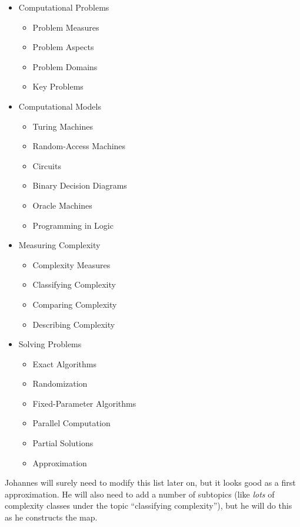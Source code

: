 \begin{itemize}
\item Computational Problems
  \begin{itemize}\itemsep=0pt\parskip=0pt
  \item Problem Measures
  \item Problem Aspects
  \item Problem Domains
  \item Key Problems
  \end{itemize}
\item Computational Models
  \begin{itemize}\itemsep=0pt\parskip=0pt
  \item Turing Machines
  \item Random-Access Machines
  \item Circuits
  \item Binary Decision Diagrams
  \item Oracle Machines
  \item Programming in Logic
  \end{itemize}
\item Measuring Complexity
  \begin{itemize}\itemsep=0pt\parskip=0pt
  \item Complexity Measures
  \item Classifying Complexity
  \item Comparing Complexity
  \item Describing Complexity
  \end{itemize}
\item Solving Problems
  \begin{itemize}\itemsep=0pt\parskip=0pt
  \item Exact Algorithms
  \item Randomization
  \item Fixed-Parameter Algorithms
  \item Parallel Computation
  \item Partial Solutions
  \item Approximation
  \end{itemize}
\end{itemize}

Johannes will surely need to modify this list later on, but it looks
good as a first approximation. He will also need to add a number of
subtopics (like \emph{lots} of complexity classes under the topic
``classifying complexity''), but he will do this as he constructs the
map.

